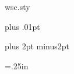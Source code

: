 \begin{filecontents*}{wsc.sty}
\let\savesubsub\subsubsection
\def\subsubsection#1{\savesubsub{\ \ #1}}


\parskip=0pt plus .01pt


\let\saveparagraph\paragraph
\def\paragraph#1{\vskip1sp
{\bf #1}\hskip1em\relax}


\raggedbottom

\newenvironment{hangref}{\begin{list}{}{\setlength{\itemsep}{0pt}
\setlength{\parsep}{0pt}\setlength{\rightmargin}{0pt}
\setlength{\leftmargin}{+\parindent}
\setlength{\itemindent}{-\parindent}}}{\end{list}}


\newif\iftitle
\def\@oddhead{\iftitle\global\titlefalse
\vtop to0pt{\hbox to.9\textwidth{\titlepageheadfont
\currentCaption\hfill}%
\vskip2pt \hbox to .9\textwidth{\titlepageheadfont
\currentEditors , eds.\hfill}%
\vss} \else \hbox
to\textwidth{\titlepageheadfont\hfill\thetitle\hfill}\fi}

\def\@evenhead{\iftitle\global\titlefalse\fi%
\hbox to \textwidth{\hss\titlepageheadfont \theauthors\hss}}

\let\@oddfoot\relax
\let\@evenfoot\@oddfoot

\def\ttitle#1{\gdef\thetitle{#1}}


\def\sk{\vskip12pt}
\let\vs\sk
\def\bd{\vskip2pt\noindent} %

\spaceskip=3.5pt plus 2pt minus2pt

\parindent=.25in


\end{filecontents*}
